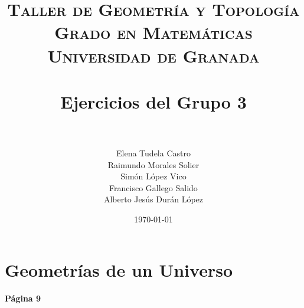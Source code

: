 
\usepackage{listings}
\usepackage{dsfont}
\usepackage{booktabs}

\title{	
\normalfont \normalsize 
\textsc{\textbf{Taller de Geometría y Topología} \\ Grado en Matemáticas \\ Universidad de Granada} \\ [25pt] %
\horrule{0.5pt} \\[0.4cm] %
\huge Ejercicios del Grupo 3  \\ %
\horrule{2pt} \\[0.5cm] %
}
\author{	
		Elena Tudela Castro \\
		Raimundo Morales Solier \\
		Simón López Vico \\
		Francisco Gallego Salido \\
		Alberto Jesús Durán López} %
\date{\normalsize\today} %




\maketitle %

\newpage %






\section{Geometrías de un Universo}

\textbf{Página 9}

